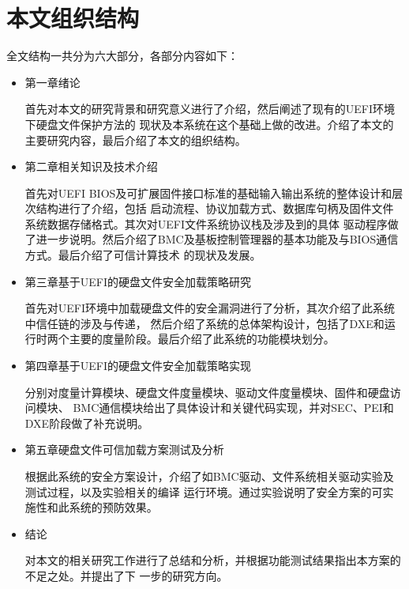 \section{本文组织结构}
全文结构一共分为六大部分，各部分内容如下：
\begin{itemize}
\item 第一章\quad 绪论
\par 首先对本文的研究背景和研究意义进行了介绍，然后阐述了现有的UEFI环境下硬盘文件保护方法的
现状及本系统在这个基础上做的改进。介绍了本文的主要研究内容，最后介绍了本文的组织结构。
\item 第二章\quad 相关知识及技术介绍
\par 首先对UEFI BIOS及可扩展固件接口标准的基础输入输出系统的整体设计和层次结构进行了介绍，包括
启动流程、协议加载方式、数据库句柄及固件文件系统数据存储格式。其次对UEFI文件系统协议栈及涉及到的具体
驱动程序做了进一步说明。然后介绍了BMC及基板控制管理器的基本功能及与BIOS通信方式。最后介绍了可信计算技术
的现状及发展。
\item 第三章\quad 基于UEFI的硬盘文件安全加载策略研究
\par 首先对UEFI环境中加载硬盘文件的安全漏洞进行了分析，其次介绍了此系统中信任链的涉及与传递，
然后介绍了系统的总体架构设计，包括了DXE和运行时两个主要的度量阶段。最后介绍了此系统的功能模块划分。
\item 第四章\quad 基于UEFI的硬盘文件安全加载策略实现
\par 分别对度量计算模块、硬盘文件度量模块、驱动文件度量模块、固件和硬盘访问模块、
BMC通信模块给出了具体设计和关键代码实现，并对SEC、PEI和DXE阶段做了补充说明。
\item 第五章\quad 硬盘文件可信加载方案测试及分析
\par 根据此系统的安全方案设计，介绍了如BMC驱动、文件系统相关驱动实验及测试过程，以及实验相关的编译
运行环境。通过实验说明了安全方案的可实施性和此系统的预防效果。
\item 结论
\par 对本文的相关研究工作进行了总结和分析，并根据功能测试结果指出本方案的不足之处。并提出了下
一步的研究方向。
\end{itemize}
